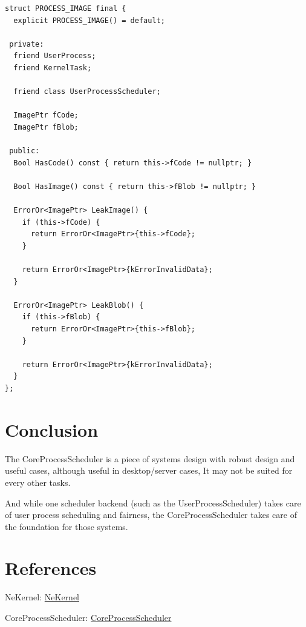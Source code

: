 \documentclass{article}
\begin{document}
\begin{verbatim}
struct PROCESS_IMAGE final {
  explicit PROCESS_IMAGE() = default;

 private:
  friend UserProcess;
  friend KernelTask;

  friend class UserProcessScheduler;

  ImagePtr fCode;
  ImagePtr fBlob;

 public:
  Bool HasCode() const { return this->fCode != nullptr; }

  Bool HasImage() const { return this->fBlob != nullptr; }

  ErrorOr<ImagePtr> LeakImage() {
    if (this->fCode) {
      return ErrorOr<ImagePtr>{this->fCode};
    }

    return ErrorOr<ImagePtr>{kErrorInvalidData};
  }

  ErrorOr<ImagePtr> LeakBlob() {
    if (this->fBlob) {
      return ErrorOr<ImagePtr>{this->fBlob};
    }

    return ErrorOr<ImagePtr>{kErrorInvalidData};
  }
};

\end{verbatim}

\section{Conclusion}

{The CoreProcessScheduler is a piece of systems design with robust design and useful cases, although useful in desktop/server cases, It may not be suited for every other tasks.}

{And while one scheduler backend (such as the UserProcessScheduler) takes care of user process scheduling and fairness, the CoreProcessScheduler takes care of the foundation for those systems.}

\section{References}

{NeKernel}: \href{https://github.com/nekernel-org/nekernel}{NeKernel}

{CoreProcessScheduler}: \href{https://github.com/nekernel-org/nekernel/blob/dev/src/kernel/KernelKit/CoreProcessScheduler.h}{CoreProcessScheduler}
\end{document}
